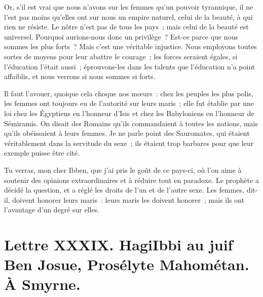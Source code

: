 \documentclass[french,twoside]{book} %
\newcommand{\dateline}[1]{\medskip{\RaggedLeft{#1}\par}\bigskip}
\begin{document}
Or, s’il est vrai que nous n’avons sur les femmes qu’un pouvoir tyrannique, il ne l’est pas moins qu’elles ont sur nous un empire naturel, celui de la beauté, à qui rien ne résiste. Le nôtre n’est pas de tous les pays ; mais celui de la beauté est universel. Pourquoi aurions-nous donc un privilège ? Est-ce parce que nous sommes les plus forts ? Mais c’est une véritable injustice. Nous employons toutes sortes de moyens pour leur abattre le courage ; les forces seraient égales, si l’éducation l’était aussi ; éprouvons-les dans les talents que l’éducation n’a point affaiblis, et nous verrons si nous sommes si forts.\par
Il faut l’avouer, quoique cela choque nos mœurs : chez les peuples les plus polis, les femmes ont toujours eu de l’autorité sur leurs maris ; elle fut établie par une loi chez les Égyptiens en l’honneur d’Isis et chez les Babyloniens en l’honneur de Sémiramis. On disait des Romains qu’ils commandaient à toutes les nations, mais qu’ils obéissaient à leurs femmes. Je ne parle point des Sauromates, qui étaient véritablement dans la servitude du sexe ; ils étaient trop barbares pour que leur exemple puisse être cité.\par
Tu verras, mon cher Ibben, que j’ai pris le goût de ce pays-ci, où l’on aime à soutenir des opinions extraordinaires et à réduire tout en paradoxe. Le prophète a décidé la question, et a réglé les droits de l’un et de l’autre sexe. Les femmes, dit-il, doivent honorer leurs maris : leurs maris les doivent honorer ; mais ils ont l’avantage d’un degré sur elles.\par

\dateline{À Paris, le 26 de la lune de Gemmadi 2, 1713.}
\section[{Lettre XXXIX. Hagi Ibbi au juif Ben Josue, Prosélyte Mahométan. À Smyrne.}]{Lettre XXXIX. Hagi\protect\footnotemark  Ibbi au juif Ben Josue, Prosélyte Mahométan. À Smyrne.}\renewcommand{\leftmark}{Lettre XXXIX. Hagi Ibbi au juif Ben Josue, Prosélyte Mahométan. À Smyrne.}
\end{document}
